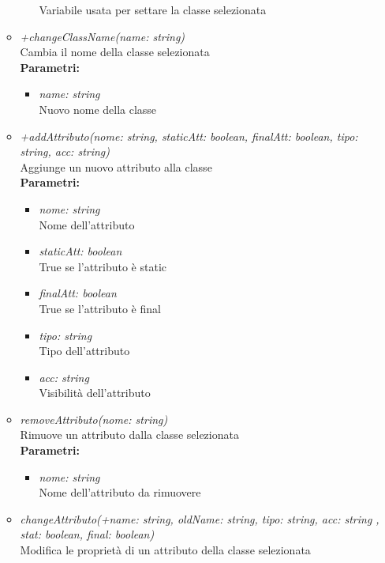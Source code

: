 \begin{itemize}
\begin{itemize}
\begin{itemize}
    			Variabile usata per settare la classe selezionata
    		\end{itemize}
    		\item \emph{+changeClassName(name: string)}\\
    		Cambia il nome della classe selezionata\\
    		\textbf{Parametri:}
    		\begin{itemize}
    			\item \emph{name: string}\\
    			Nuovo nome della classe
    		\end{itemize}
    		\item \emph{+addAttributo(nome: string, staticAtt: boolean, finalAtt: boolean, tipo: string, acc: string)}\\
    		Aggiunge un nuovo attributo alla classe\\
    		\textbf{Parametri:}
    		\begin{itemize}
    			\item \emph{nome: string}\\
    			Nome dell'attributo
    			\item \emph{staticAtt: boolean}\\
    			True se l'attributo è static
    			\item \emph{finalAtt: boolean}\\
    			True se l'attributo è final
    			\item \emph{tipo: string}\\
    			Tipo dell'attributo
    			\item \emph{acc: string}\\
    			Visibilità dell'attributo
    		\end{itemize}
    		\item \emph{removeAttributo(nome: string)}\\
    		Rimuove un attributo dalla classe selezionata\\
    		\textbf{Parametri:}
    		\begin{itemize}
    			\item \emph{nome: string}\\
    			Nome dell'attributo da rimuovere
    		\end{itemize}
    		\item \emph{changeAttributo(+name: string, oldName: string, tipo: string, acc: string , stat: boolean, final: boolean)}\\
    		Modifica le proprietà di un attributo della classe selezionata\\

\end{itemize}
\end{itemize}
